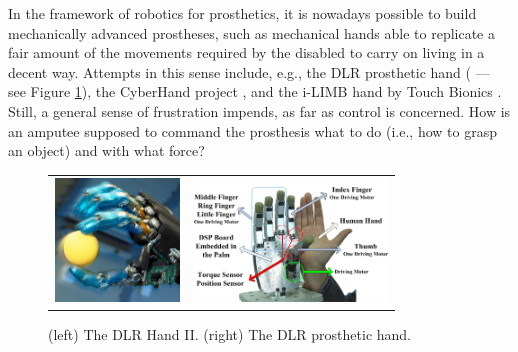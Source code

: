 In the framework of robotics for prosthetics, it is nowadays possible
to build mechanically advanced prostheses, such as mechanical hands
able to replicate a fair amount of the movements required by the
disabled to carry on living in a decent way.  Attempts in this sense
include, e.g., the DLR prosthetic hand (\cite{Hua2006} --- see Figure
\ref{fig:DLRHandII}), the CyberHand project \cite{cyberhand}, and the
i-LIMB hand by Touch Bionics \cite{ilimb}. Still, a general sense of
frustration impends, as far as control is concerned. How is an amputee
supposed to command the prosthesis what to do (i.e., how to grasp an
object) and with what force?

\begin{figure}
  \begin{tabular}{cc}
    \includegraphics[height=3.3cm]{figs/DLRHand-Ball-comp} &
    \includegraphics[height=3.3cm]{figs/DLR-Prothese}
  \end{tabular}
  \caption{(left) The DLR Hand II. (right) The DLR prosthetic hand.}
  \label{fig:DLRHandII}
\end{figure}

